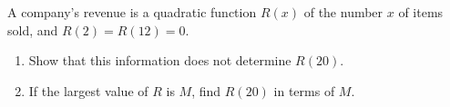 A company's revenue is a quadratic function $R(x)$ of the number $x$ of items sold, and $R(2)=R(12)=0$.
\begin{enumerate}
\item[(a)] Show that this information does not determine $R(20)$.
\item[(b)] If the largest value of $R$ is $M$, find $R(20)$ in terms of $M$.
\end{enumerate}
